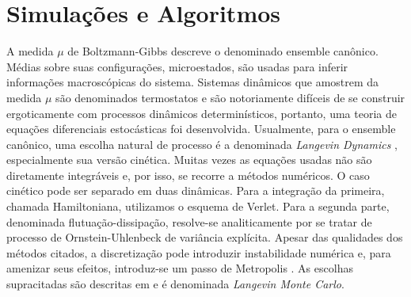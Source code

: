 \chapter{Simulações e Algoritmos}
\label{Capitulo: Simulações}

A medida $\mu$ de Boltzmann-Gibbs descreve o denominado ensemble canônico. Médias sobre suas configurações, microestados, são usadas para inferir informações macroscópicas do sistema. Sistemas dinâmicos que amostrem da medida $\mu$ são denominados termostatos e são notoriamente difíceis de se construir ergoticamente com processos dinâmicos determinísticos, portanto, uma teoria de equações diferenciais estocásticas foi desenvolvida. Usualmente, para o ensemble canônico, uma escolha natural de processo é a denominada \textit{Langevin Dynamics} \cite[Capítulo~6]{leimmolecular}, especialmente sua versão cinética. Muitas vezes as equações usadas não são diretamente integráveis e, por isso, se recorre a métodos numéricos. O caso cinético pode ser separado em duas dinâmicas. Para a integração da primeira, chamada Hamiltoniana, utilizamos o esquema de Verlet. Para a segunda parte, denominada flutuação-dissipação, resolve-se analiticamente por se tratar de processo de Ornstein-Uhlenbeck de variância explícita. Apesar das qualidades dos métodos citados, a discretização pode introduzir instabilidade numérica e, para amenizar seus efeitos, introduz-se um passo de Metropolis \cite[Apêndice~C]{leimmolecular}. As escolhas supracitadas são descritas em \cite{Chafa2018} e é denominada \textit{Langevin Monte Carlo}.






%









